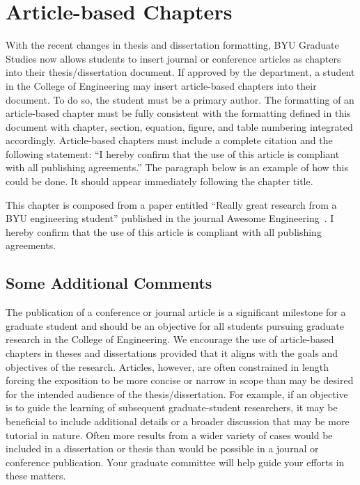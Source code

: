 \chapter{Article-based Chapters}
\label{ch:article_based_chap}

With the recent changes in thesis and dissertation formatting, BYU Graduate Studies now allows students to insert journal or conference articles as chapters into their thesis/dissertation document. If approved by the department, a student in the College of Engineering may insert article-based chapters into their document. To do so, the student must be a primary author. The formatting of an article-based chapter must be fully consistent with the formatting defined in this document with chapter, section, equation, figure, and table numbering integrated accordingly. Article-based chapters must include a complete citation and the following statement: ``I hereby confirm that the use of this article is compliant with all publishing agreements.'' The paragraph below is an example of how this could be done. It should appear immediately following the chapter title.

\vspace{0.1in}
\noindent This chapter is composed from a paper entitled ``Really great research from a BYU engineering student'' published in the journal Awesome Engineering~\cite{StudentRP20}. I hereby confirm that the use of this article is compliant with all publishing agreements.



\section{Some Additional Comments}
The publication of a conference or journal article is a significant milestone for a graduate  student and should be an objective for all students pursuing graduate research in the College of Engineering. We encourage the use of article-based chapters in theses and dissertations provided that it aligns with the goals and objectives of the research. Articles, however, are often constrained in length forcing the exposition to be more concise or narrow in scope than may be desired for the intended audience of the thesis/dissertation. For example, if an objective is to guide the learning of subsequent graduate-student researchers, it may be beneficial to include additional details or a broader discussion that may be more tutorial in nature. Often more results from a wider variety of cases would be included in a dissertation or thesis than would be possible in a journal or conference publication. Your graduate committee will help guide your efforts in these matters.
